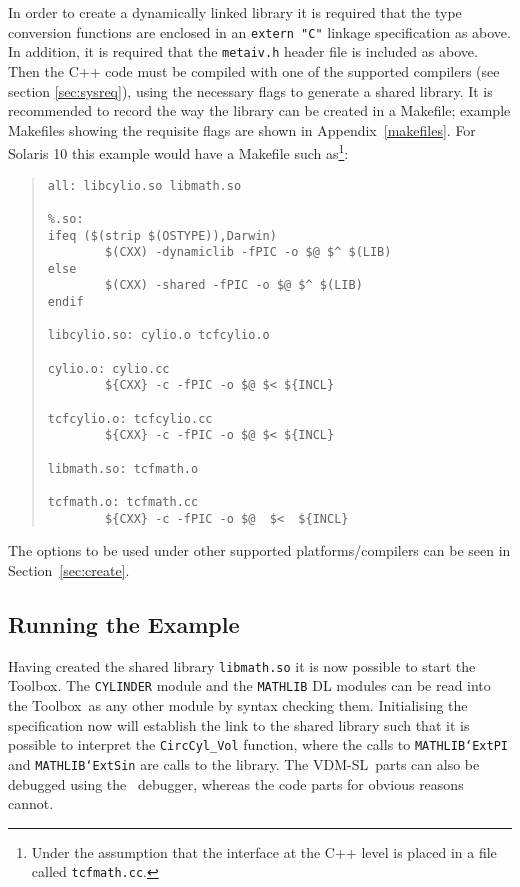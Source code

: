 \documentclass[\pformat,12pt]{article}
\newcommand{\vdmslpp}{VDM-SL}
\newcommand{\Toolbox}{Toolbox}
\begin{document}
In order to create a dynamically linked library it is required that
the type conversion functions are enclosed in an {\tt extern "C"}
linkage specification as above. In addition, it is required that the
{\tt metaiv.h} header file is included as above. Then the C++ code
must be compiled with one of the supported compilers (see section
\ref{sec:sysreq}), using the necessary flags to generate a shared
library. It is recommended to record the way the library can be 
created in a Makefile; example Makefiles showing the requisite flags
are shown in Appendix~\ref{makefiles}. 
For Solaris 10 this example would have a Makefile
such as\footnote{Under the assumption that the interface at the C++
  level is placed in a file called {\tt tcfmath.cc}.}:

\begin{quote}
\begin{verbatim}
all: libcylio.so libmath.so

%.so:
ifeq ($(strip $(OSTYPE)),Darwin)
        $(CXX) -dynamiclib -fPIC -o $@ $^ $(LIB)
else
        $(CXX) -shared -fPIC -o $@ $^ $(LIB)
endif

libcylio.so: cylio.o tcfcylio.o 

cylio.o: cylio.cc
        ${CXX} -c -fPIC -o $@ $< ${INCL}

tcfcylio.o: tcfcylio.cc
        ${CXX} -c -fPIC -o $@ $< ${INCL}

libmath.so: tcfmath.o

tcfmath.o: tcfmath.cc
        ${CXX} -c -fPIC -o $@  $<  ${INCL}
\end{verbatim}
\end{quote}

The options to be used under other supported platforms/compilers can
be seen in Section~\ref{sec:create}.

\subsection*{Running the Example}

Having created the shared library {\tt libmath.so} it is now possible
to start the Toolbox. The {\tt CYLINDER} module and the {\tt MATHLIB} DL
modules can be read into the \Toolbox\ as any other module by syntax
checking them. Initialising the specification now will establish the
link to the shared library such that it is possible to interpret the
{\tt CircCyl\_Vol} function, where the calls to {\tt MATHLIB`ExtPI} and
{\tt MATHLIB`ExtSin} are calls to the library.  The \vdmslpp\ parts can
also be debugged using the \VDMTools\ debugger, whereas the code parts
for obvious reasons cannot.
\end{document}
